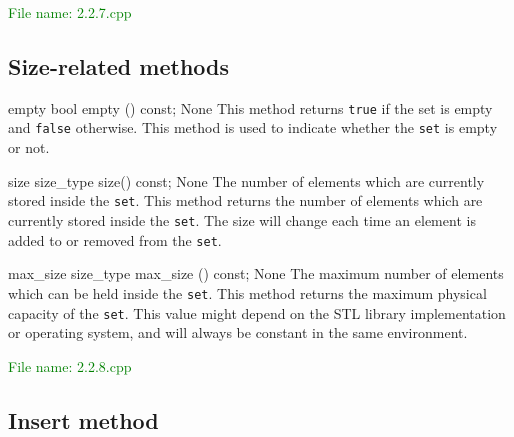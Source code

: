 \textcolor{green}{File name: 2.2.7.cpp} 
 

\subsection{Size-related methods} %

\begin{methodinfo}
  {empty}
  {bool empty () const;}
  {None}
  {This method returns \texttt{true} if the set is empty and \texttt{false} otherwise.}
  {This method is used to indicate whether the \texttt{set} is empty or not.}
\end{methodinfo}
\begin{methodinfo}
  {size}
  {size_type size() const;}
  {None}
  {The number of elements which are currently stored inside the \texttt{set}.}
  {This method returns the number of elements which are currently stored inside the \texttt{set}. 
  The size will change each time an element is added to or removed from the \texttt{set}.}
\end{methodinfo}
\begin{methodinfo}
  {max_size}
  {size_type max_size () const;}
  {None}
  {The maximum number of elements which can be held inside the \texttt{set}.}
  {This method returns the maximum physical capacity of the \texttt{set}. This value might depend on 
  the STL library implementation or operating system, and will always be constant in the same environment.}
\end{methodinfo}

\textcolor{green}{File name: 2.2.8.cpp} 
 

\subsection{Insert method} %

